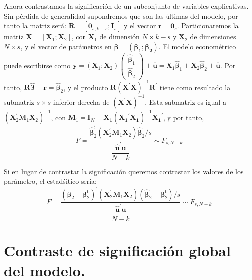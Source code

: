 Ahora contrastamos la significaci\'on de un subconjunto de variables
explicativas. Sin p\'erdida de generalidad supondremos que son las \'ultimas
del modelo, por tanto la matriz ser\'a: $\boldsymbol{R}=\left[\boldsymbol{0}_{s,k-s};\boldsymbol{I}_{s}\right]$
y el vector $\boldsymbol{r}=\boldsymbol{0}_{s}$. Particionaremos
la matriz $\boldsymbol{X}=\left[\boldsymbol{X}_{1};\boldsymbol{X}_{2}\right]$,
con $\boldsymbol{X}_{1}$ de dimensi\'on $N\times k-s$ y $\boldsymbol{X}_{2}$
de dimensiones $N\times s$, y el vector de par\'ametros en $\boldsymbol{\beta}=\left(\mathbf{\boldsymbol{\beta}_{1};\boldsymbol{\beta}_{2}}\right)$.
El modelo econom\'etrico puede escribirse como $\boldsymbol{y}=\left(\boldsymbol{X}_{1};\boldsymbol{X}_{2}\right)\left(\begin{array}{c}
\hat{\boldsymbol{\boldsymbol{\beta}}}_{1}\\
\boldsymbol{\hat{\boldsymbol{\beta}}}_{2}
\end{array}\right)+\hat{\boldsymbol{u}}=\boldsymbol{X}_{1}\hat{\boldsymbol{\boldsymbol{\beta}}}_{1}+\boldsymbol{X}_{2}\boldsymbol{\hat{\boldsymbol{\beta}}}_{2}+\hat{\boldsymbol{u}}$. Por tanto, $\boldsymbol{R}\hat{\boldsymbol{\beta}}-\boldsymbol{r}=\boldsymbol{\hat{\boldsymbol{\beta}}}_{2}$,
y el producto $\boldsymbol{R}\left(\boldsymbol{X}^{\prime}\boldsymbol{X}\right)^{-1}\boldsymbol{R}^{\prime}$
tiene como resultado la submatriz $s\times s$ inferior derecha de
$\left(\boldsymbol{X}^{\prime}\boldsymbol{X}\right)^{-1}$. Esta submatriz
es igual a $\left(\boldsymbol{X}^{\prime}_{2}\boldsymbol{M}_{1}\boldsymbol{X}_{2}\right)^{-1}$,
con $\boldsymbol{M}_{1}=\boldsymbol{I}_{N}-\boldsymbol{X_{1}}\left(\boldsymbol{X_{1}}^{\prime}\boldsymbol{X_{1}}\right)^{-1}\boldsymbol{X_{1}}^{\prime}$,
y por tanto, 
\[
F=\dfrac{\hat{\boldsymbol{\beta}}^{\prime}_{2}\left(\boldsymbol{X}^{\prime}_{2}\boldsymbol{M}_{1}\boldsymbol{X}_{2}\right)\hat{\boldsymbol{\beta}}_{2}/s}{\dfrac{\hat{\boldsymbol{u}}^{\prime}\hat{\boldsymbol{u}}}{N-k}}\sim F_{s,N-k}
\]


Si en lugar de contrastar la significaci\'on queremos contrastar los
valores de los par\'ametro, el estad\'{s}itico ser\'ia:
\[
F=\dfrac{\left(\hat{\boldsymbol{\beta}}_{2}-\boldsymbol{\beta}_{2}^{0}\right)^{\prime}\left(\boldsymbol{X}^{\prime}_{2}\boldsymbol{M}_{1}\boldsymbol{X}_{2}\right)\left(\hat{\boldsymbol{\beta}}_{2}-\boldsymbol{\beta}_{2}^{0}\right)/s}{\dfrac{\hat{\boldsymbol{u}}^{\prime}\hat{\boldsymbol{u}}}{N-k}}\sim F_{s,N-k}
\]



\section{Contraste de significaci\'on global del modelo.}

